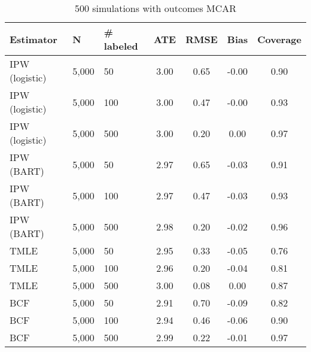 \begin{table}[ht]
\centering
\begingroup\small
\begin{tabular}{lllcccc}
  \hline
Estimator & N & \# labeled & ATE & RMSE & Bias & Coverage \\ 
  \hline
  IPW (logistic) & 5,000 &  50 & 3.00 & 0.65 & -0.00 & 0.90 \\ 
  IPW (logistic) & 5,000 & 100 & 3.00 & 0.47 & -0.00 & 0.93 \\ 
  IPW (logistic) & 5,000 & 500 & 3.00 & 0.20 & 0.00 & 0.97 \\ 
  IPW (BART) & 5,000 &  50 & 2.97 & 0.65 & -0.03 & 0.91 \\ 
  IPW (BART) & 5,000 & 100 & 2.97 & 0.47 & -0.03 & 0.93 \\ 
  IPW (BART) & 5,000 & 500 & 2.98 & 0.20 & -0.02 & 0.96 \\ 
  TMLE & 5,000 &  50 & 2.95 & 0.33 & -0.05 & 0.76 \\ 
  TMLE & 5,000 & 100 & 2.96 & 0.20 & -0.04 & 0.81 \\ 
  TMLE & 5,000 & 500 & 3.00 & 0.08 & 0.00 & 0.87 \\ 
  BCF & 5,000 &  50 & 2.91 & 0.70 & -0.09 & 0.82 \\ 
  BCF & 5,000 & 100 & 2.94 & 0.46 & -0.06 & 0.90 \\ 
  BCF & 5,000 & 500 & 2.99 & 0.22 & -0.01 & 0.97 \\ 
   \hline
\end{tabular}
\endgroup
\caption{500 simulations with outcomes MCAR} 
\end{table}
